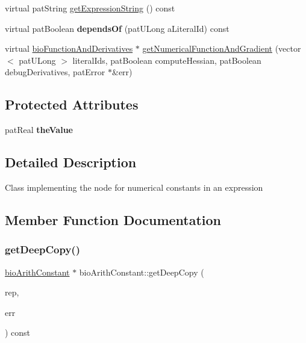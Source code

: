 \begin{DoxyCompactItemize}
\item 
virtual pat\+String \hyperlink{classbio_arith_constant_ae815cae63ba8b2807c653fc1ca343672}{get\+Expression\+String} () const
\item 
\mbox{\label{classbio_arith_constant_a098b5439de43bf80c63415aebc4dfffc}} 
virtual pat\+Boolean {\bfseries depends\+Of} (pat\+U\+Long a\+Literal\+Id) const
\item 
virtual \hyperlink{classbio_function_and_derivatives}{bio\+Function\+And\+Derivatives} $\ast$ \hyperlink{classbio_arith_constant_a42bfbc2f6dfc86d5530fee64146b2172}{get\+Numerical\+Function\+And\+Gradient} (vector$<$ pat\+U\+Long $>$ literal\+Ids, pat\+Boolean compute\+Hessian, pat\+Boolean debug\+Derivatives, pat\+Error $\ast$\&err)
\end{DoxyCompactItemize}
\subsection*{Protected Attributes}
\begin{DoxyCompactItemize}
\item 
\mbox{\label{classbio_arith_constant_acac35d0d81e46fc992e046a3e2302edb}} 
pat\+Real {\bfseries the\+Value}
\end{DoxyCompactItemize}


\subsection{Detailed Description}
Class implementing the node for numerical constants in an expression 

\subsection{Member Function Documentation}
\mbox{\label{classbio_arith_constant_af2f4fed6a41757d2cfa06a06b4d16923}} 
\subsubsection{\texorpdfstring{get\+Deep\+Copy()}{getDeepCopy()}}
{\footnotesize\ttfamily \hyperlink{classbio_arith_constant}{bio\+Arith\+Constant} $\ast$ bio\+Arith\+Constant\+::get\+Deep\+Copy (\begin{DoxyParamCaption}\item[{\hyperlink{classbio_expression_repository}{bio\+Expression\+Repository} $\ast$}]{rep,  }\item[{pat\+Error $\ast$\&}]{err }\end{DoxyParamCaption}) const\hspace{0.3cm}{\ttfamily [virtual]}}

